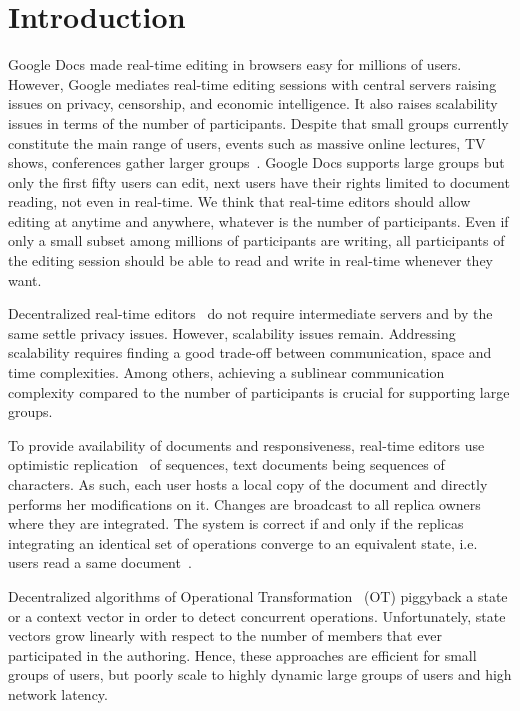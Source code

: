 

\section{Introduction}

Google Docs made real-time editing in browsers easy for millions of
users. However, Google mediates real-time editing sessions with central servers
raising issues on privacy, censorship, and economic intelligence. It also raises
scalability issues in terms of the number of participants.  Despite that small
groups currently constitute the main range of users, events such as massive
online lectures, TV shows, conferences gather larger
groups~\cite{breslow2013studying}.  Google Docs supports large groups but only
the first fifty users can edit, next users have their rights limited to document
reading, not even in real-time.  We think that real-time editors should allow
editing at anytime and anywhere, whatever is the number of participants. Even if
only a small subset among millions of participants are writing, all participants
of the editing session should be able to read and write in real-time whenever
they want.

Decentralized real-time editors~\cite{oster2006data, sun1998operational,
  sun2009contextbased} do not require intermediate servers and by the same
settle privacy issues. However, scalability issues remain.  Addressing
scalability requires finding a good trade-off between communication, space and
time complexities. Among others, achieving a sublinear communication complexity
compared to the number of participants is crucial for supporting large groups.

To provide availability of documents and responsiveness, real-time editors use
optimistic replication~\cite{saito2005optimistic} of sequences, text documents
being sequences of characters. As such, each user hosts a local copy of the
document and directly performs her modifications on it. Changes are broadcast to
all replica owners where they are integrated. The system is correct if and only
if the replicas integrating an identical set of operations converge to an
equivalent state, i.e. users read a same document~\cite{shapiro2011conflict}.

Decentralized algorithms of Operational
Transformation~\cite{sun2009contextbased} (OT) piggyback a state or a context
vector in order to detect concurrent operations. Unfortunately, state vectors
grow linearly with respect to the number of members that ever participated in
the authoring. Hence, these approaches are efficient for small groups of users,
but poorly scale to highly dynamic large groups of users and high network
latency.

